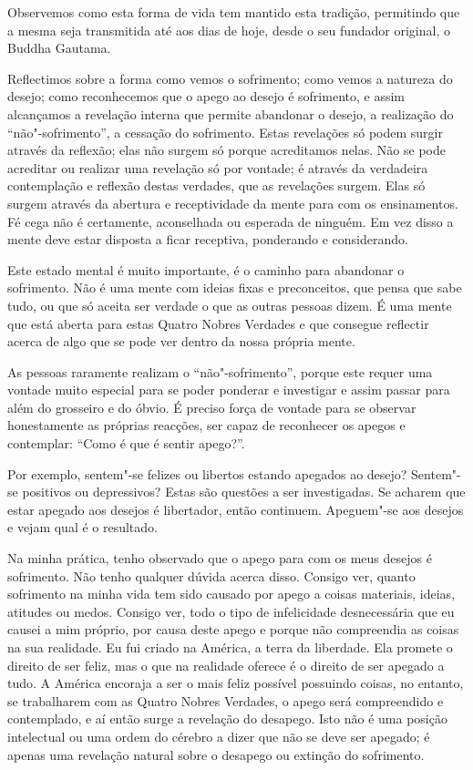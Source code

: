 Observemos como esta forma de vida tem mantido esta tradição, permitindo que a
mesma seja transmitida até aos dias de hoje, desde o seu fundador original, o
Buddha Gautama.

Reflectimos sobre a forma como vemos o sofrimento; como vemos a natureza do
desejo; como reconhecemos que o apego ao desejo é sofrimento, e assim alcançamos
a revelação interna que permite abandonar o desejo, a realização do
“não"-sofrimento”, a cessação do sofrimento. Estas revelações só podem surgir
através da reflexão; elas não surgem só porque acreditamos nelas. Não se pode
acreditar ou realizar uma revelação só por vontade; é através da verdadeira
contemplação e reflexão destas verdades, que as revelações surgem. Elas só
surgem através da abertura e receptividade da mente para com os ensinamentos. Fé
cega não é certamente, aconselhada ou esperada de ninguém. Em vez disso a mente
deve estar disposta a ficar receptiva, ponderando e considerando.

Este estado mental é muito importante, é o caminho para abandonar o sofrimento.
Não é uma mente com ideias fixas e preconceitos, que pensa que sabe tudo, ou que
só aceita ser verdade o que as outras pessoas dizem. É uma mente que está aberta
para estas Quatro Nobres Verdades e que consegue reflectir acerca de algo que se
pode ver dentro da nossa própria mente.

As pessoas raramente realizam o “não"-sofrimento”, porque este requer uma vontade
muito especial para se poder ponderar e investigar e assim passar para além do
grosseiro e do óbvio. É preciso força de vontade para se observar honestamente
as próprias reacções, ser capaz de reconhecer os apegos e contemplar: “Como é
que é sentir apego?”.

Por exemplo, sentem"-se felizes ou libertos estando apegados ao desejo?
Sentem"-se positivos ou depressivos? Estas são questões a ser investigadas. Se
acharem que estar apegado aos desejos é libertador, então continuem. Apeguem"-se
aos desejos e vejam qual é o resultado.

Na minha prática, tenho observado que o apego para com os meus desejos é
sofrimento. Não tenho qualquer dúvida acerca disso. Consigo ver, quanto
sofrimento na minha vida tem sido causado por apego a coisas materiais, ideias,
atitudes ou medos. Consigo ver, todo o tipo de infelicidade desnecessária que eu
causei a mim próprio, por causa deste apego e porque não compreendia as coisas
na sua realidade. Eu fui criado na América, a terra da liberdade. Ela promete o
direito de ser feliz, mas o que na realidade oferece é o direito de ser apegado
a tudo. A América encoraja a ser o mais feliz possível possuindo coisas, no
entanto, se trabalharem com as Quatro Nobres Verdades, o apego será compreendido
e contemplado, e aí então surge a revelação do desapego. Isto não é uma posição
intelectual ou uma ordem do cérebro a dizer que não se deve ser apegado; é
apenas uma revelação natural sobre o desapego ou extinção do sofrimento.

